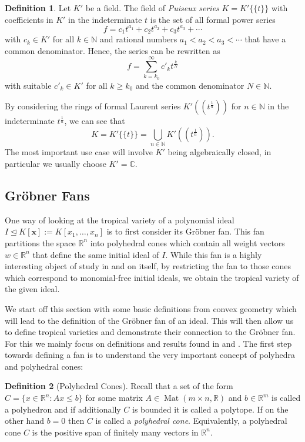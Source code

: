 \documentclass[
  paper=a4,
  DIV=14,
  fontsize=12pt,
  titlepage,
  bibliography=totoc,
  listof=totoc,
  pagesize=pdftex
]{scrartcl}
\numberwithin{figure}{section}
\numberwithin{equation}{section}
\numberwithin{table}{section}
\newcommand*\setR{\mathds{R}}
\newcommand*\setC{\mathds{C}}
\newcommand*\setN{\mathds{N}}
\newcommand*\puiseux[2]{#1\{\!\{#2\}\!\}}
\let\vec\mathbf
\let\idealof\trianglelefteq
\DeclareMathOperator{\Mat}{Mat}
\theoremstyle{definition}
\newtheorem{definition}{Definition}
\numberwithin{definition}{section}
\begin{document}
\begin{definition}
  Let $K'$ be a field. The field of \emph{Puiseux series} $K = \puiseux{K'}{t}$ with
  coefficients in $K'$ in the indeterminate $t$ is the set of all formal power series
  \[
    f = c_1 t^{a_1} + c_2 t^{a_2} + c_3 t^{a_3} + \cdots
  \]
  with $c_k \in K'$ for all $k \in \setN$ and rational numbers $a_1 < a_2 < a_3 < \cdots$
  that have a common denominator. Hence, the series can be rewritten as
  \[
    f = \sum_{k = k_0}^\infty c'_k t^{\frac kN}
  \]
  with suitable $c'_k \in K'$ for all $k\geq k_0$ and the common denominator $N \in
  \setN$.
  \label{def:puiseux}
\end{definition}

By considering the rings of formal Laurent series $K'((t^{\frac1n}))$ for $n \in \setN$ in
the indeterminate $t^{\frac1n}$, we can see that
\[
  K = \puiseux{K'}t = \bigcup_{n \in \setN} K'((t^{\frac1n})).
\]
The most important use case will involve $K'$ being algebraically closed, in particular we
usually choose $K'=\setC$.

\subsection{Gröbner Fans}
\label{sec:grobFan}

One way of looking at the tropical variety of a polynomial ideal $I \idealof K[\vec x] :=
K[x_1, \dots, x_n]$ is to first consider its Gröbner fan. This fan partitions the space
$\setR^n$ into polyhedral cones which contain all weight vectors $w\in \setR^n$ that
define the same initial ideal of $I$. While this fan is a highly interesting object of
study in and on itself, by restricting the fan to those cones which correspond to
monomial-free initial ideals, we obtain the tropical variety of the given ideal.

We start off this section with some basic definitions from convex geometry which will lead
to the definition of the Gröbner fan of an ideal. This will then allow us to define
tropical varieties and demonstrate their connection to the Gröbner fan. For this we mainly
focus on definitions and results found in \cite{compGrobFan} and \cite{SturmGBCP}. The
first step towards defining a fan is to understand the very important concept of polyhedra
and polyhedral cones:

\begin{definition}[Polyhedral Cones]
  Recall that a set of the form $C = \{ x \in \setR^n : Ax \leq b \}$ for some matrix $A
  \in \Mat(m\times n, \setR)$ and $b \in \setR^m$ is called a polyhedron and if
  additionally $C$ is bounded it is called a polytope. If on the other hand $b=0$ then $C$
  is called a \emph{polyhedral cone}. Equivalently, a polyhedral cone $C$ is the positive
  span of finitely many vectors in $\setR^n$.
  \label{def:polyhedralCone}
\end{definition}
\end{document}
